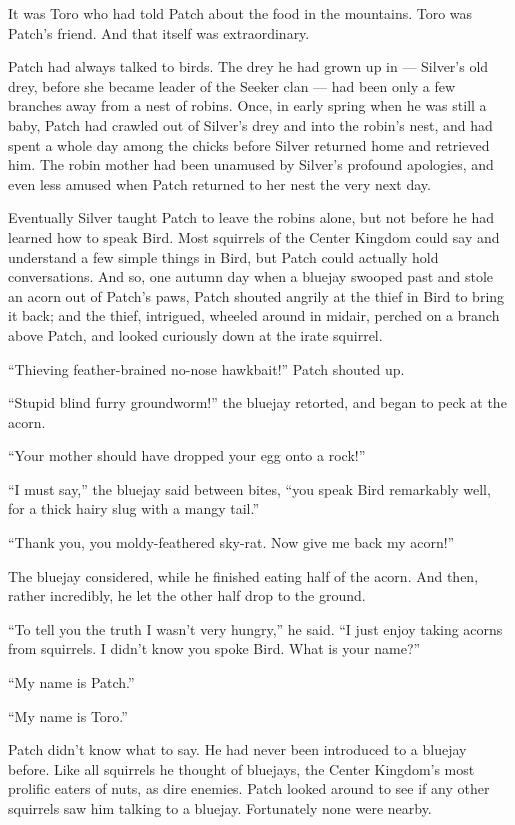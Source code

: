 \documentclass[ebook,oneside,openany,17pt]{memoir}
\newenvironment{tolerant}[1]{%
  \par\tolerance=#1\relax
}{%
  \par
}
\begin{document}
It was Toro who had told Patch about the food in the mountains. Toro
was Patch’s friend. And that itself was extraordinary.

Patch had always talked to birds. The drey he had grown up in —
Silver’s old drey, before she became leader of the Seeker clan — had
been only a few branches away from a nest of robins. Once, in early
spring when he was still a baby, Patch had crawled out of Silver’s
drey and into the robin’s nest, and had spent a whole day among the
chicks before Silver returned home and retrieved him. The robin mother
had been unamused by Silver’s profound apologies, and even less amused
when Patch returned to her nest the very next day.

Eventually Silver taught Patch to leave the robins alone, but not
before he had learned how to speak Bird. Most squirrels of the Center
Kingdom could say and understand a few simple things in Bird, but
Patch could actually hold conversations. And so, one autumn day when a
bluejay swooped past and stole an acorn out of Patch’s paws, Patch
shouted angrily at the thief in Bird to bring it back; and the thief,
intrigued, wheeled around in midair, perched on a branch above Patch,
and looked curiously down at the irate squirrel.

\begin{tolerant}{5000}
“Thieving feather-brained no-nose hawkbait!” Patch shouted up.
\end{tolerant}

“Stupid blind furry groundworm!” the bluejay retorted, and began to
peck at the acorn.

“Your mother should have dropped your egg onto a rock!”

“I must say,” the bluejay said between bites, “you speak Bird
remarkably well, for a thick hairy slug with a mangy tail.”

“Thank you, you moldy-feathered sky-rat. Now give me back my acorn!”

The bluejay considered, while he finished eating half of the
acorn. And then, rather incredibly, he let the other half drop to the
ground.

“To tell you the truth I wasn’t very hungry,” he said. “I just enjoy
taking acorns from squirrels. I didn’t know you spoke Bird. What is
your name?”

“My name is Patch.”

“My name is Toro.”

Patch didn’t know what to say. He had never been introduced to a
bluejay before. Like all squirrels he thought of bluejays, the Center
Kingdom’s most prolific eaters of nuts, as dire enemies. Patch looked
around to see if any other squirrels saw him talking to a
bluejay. Fortunately none were nearby.
\end{document}
